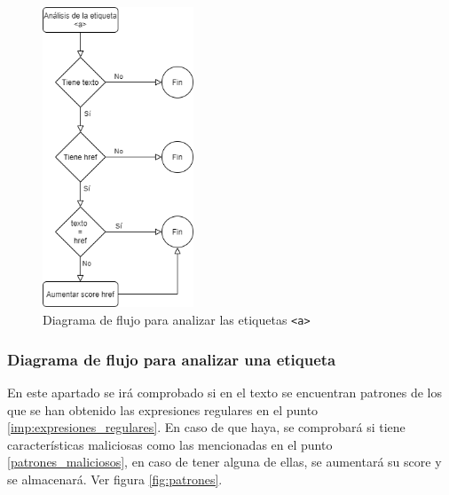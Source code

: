 \begin{figure}[htb]
    \centering
    \includegraphics[width=0.4\textwidth]{imagenes/DiagramasFlujo/etiqueta_a.png}
\caption{Diagrama de flujo para analizar las etiquetas 
\texttt{<a>}}
\label{fig:etiquetas_a}
\end{figure}


\subsubsection{Diagrama de flujo para analizar una etiqueta}
En este apartado se irá comprobado si en el texto se encuentran patrones de los que se han obtenido las expresiones regulares en el punto \ref{imp:expresiones_regulares}. En caso de que haya, se comprobará si tiene características maliciosas como las mencionadas en el punto \ref{patrones_maliciosos}, en caso de tener alguna de ellas, se aumentará su score y se almacenará.  Ver figura \ref{fig:patrones}.

